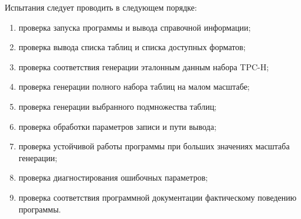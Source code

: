 Испытания следует проводить в следующем порядке:
\begin{enumerate}
    \item проверка запуска программы и вывода справочной информации;
    \item проверка вывода списка таблиц и списка доступных форматов;
    \item проверка соответствия генерации эталонным данным набора TPC-H;
    \item проверка генерации полного набора таблиц на малом масштабе;
    \item проверка генерации выбранного подмножества таблиц;
    \item проверка обработки параметров записи и пути вывода;
    \item проверка устойчивой работы программы при больших значениях масштаба
    генерации;
    \item проверка диагностирования ошибочных параметров;
    \item проверка соответствия программной документации фактическому поведению
    программы.
\end{enumerate}
